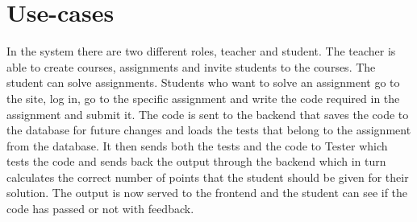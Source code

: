 \section{Use-cases}
In the system there are two different roles, teacher and student. The teacher is able to create courses, assignments and invite students to the courses. The student can solve assignments.
Students who want to solve an assignment go to the site, log in, go to the specific assignment and write the code required in the assignment and submit it. The code is sent to the backend that saves the code to the database for future changes and loads the tests that belong to the assignment from the database. It then sends both the tests and the code to Tester which tests the code and sends back the output through the backend which in turn calculates the correct number of points that the student should be given for their solution. The output is now served to the frontend and the student can see if the code has passed or not with feedback.


